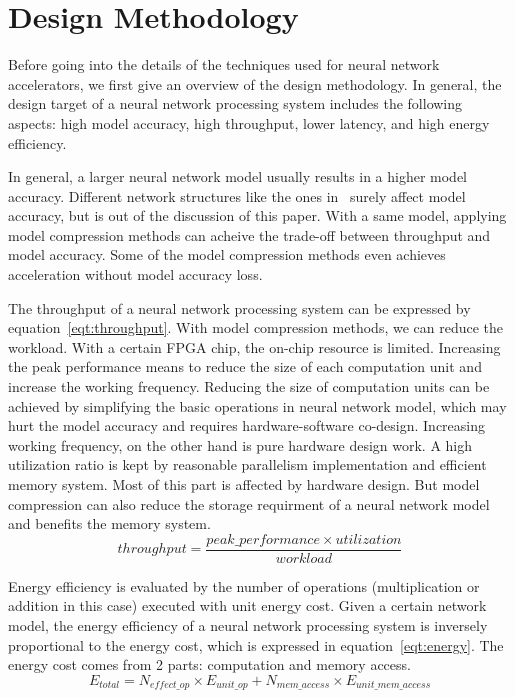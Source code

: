 \section{Design Methodology}\label{sec:design_method}

Before going into the details of the techniques used for neural network accelerators, we first give an overview of the design methodology. In general, the design target of a neural network processing system includes the following aspects: high model accuracy, high throughput, lower latency, and high energy efficiency.

In general, a larger neural network model usually results in a higher model accuracy. Different network structures like the ones in~\cite{krizhevsky2012imagenet, simonyan2014very, he2016deep} surely affect model accuracy, but is out of the discussion of this paper. With a same model, applying model compression methods can acheive the trade-off between throughput and model accuracy. Some of the model compression methods even achieves acceleration without model accuracy loss.

The throughput of a neural network processing system can be expressed by equation~\ref{eqt:throughput}. With model compression methods, we can reduce the workload. With a certain FPGA chip, the on-chip resource is limited. Increasing the peak performance means to reduce the size of each computation unit and increase the working frequency. Reducing the size of computation units can be achieved by simplifying the basic operations in neural network model, which may hurt the model accuracy and requires hardware-software co-design. Increasing working frequency, on the other hand is pure hardware design work. A high utilization ratio is kept by reasonable parallelism implementation and efficient memory system. Most of this part is affected by hardware design. But model compression can also reduce the storage requirment of a neural network model and benefits the memory system.
\begin{equation}\label{eqt:throughput}
    throughput = \frac{peak\_performance \times utilization}{workload}
\end{equation}

Energy efficiency is evaluated by the number of operations (multiplication or addition in this case) executed with unit energy cost. Given a certain network model, the energy efficiency of a neural network processing system is inversely proportional to the energy cost, which is expressed in equation~\ref{eqt:energy}. The energy cost comes from 2 parts: computation and memory access. 
\begin{equation}\label{eqt:energy}
    E_{total} = N_{effect\_op}\times E_{unit\_op} + N_{mem\_access}\times E_{unit\_mem\_access}
\end{equation}

